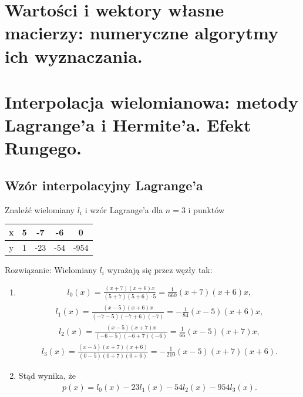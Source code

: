 \documentclass[12pt]{article}
\begin{document}
    \newpage

    \section{Wartości i wektory własne macierzy: numeryczne algorytmy ich wyznaczania.}

    \newpage

    \section{Interpolacja wielomianowa: metody Lagrange'a i Hermite'a. Efekt Rungego.}

    \subsection{Wzór interpolacyjny Lagrange'a}
    \begin{exercise}
        Znaleźć wielomiany $l_i$ i wzór Lagrange'a dla $n=3$ i punktów
        \begin{tabular}{|c|c|c|c|c|}
            \hline
            x & 5 & -7 & -6 & 0    \\ \hline
            y & 1 & -23 & -54 & -954 \\ \hline
        \end{tabular}
    \end{exercise}
    Rozwiązanie:
    Wielomiany $l_i$ wyrażają się przez węzły tak:
    \begin{enumerate}
        \item
        \begin{align*}
            l_0(x)=\frac{(x+7)(x+6)x}{(5+7)(5+6)\cdot5}=\frac{1}{660}(x+7)(x+6)x,
        \end{align*}
        \begin{align*}
            l_1(x)=\frac{(x-5)(x+6)x}{(-7-5)(-7+6)(-7)}=-\frac{1}{84}(x-5)(x+6)x,
        \end{align*}
        \begin{align*}
            l_2(x)=\frac{(x-5)(x+7)x}{(-6-5)(-6+7)(-6)}=\frac{1}{66}(x-5)(x+7)x,
        \end{align*}
        \begin{align*}
            l_3(x)=\frac{(x-5)(x+7)(x+6)}{(0-5)(0+7)(0+6)}=-\frac{1}{210}(x-5)(x+7)(x+6).
        \end{align*}


        \item
        Stąd wynika, że
        \begin{align*}
            p(x)=l_0(x)-23l_1(x)-54l_2(x)-954l_3(x).
        \end{align*}
    \end{enumerate}
\end{document}
